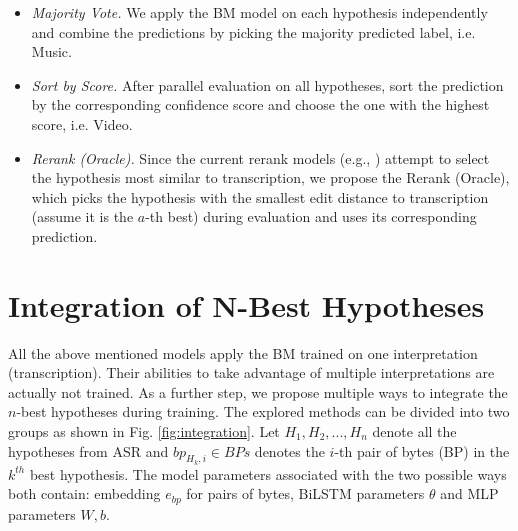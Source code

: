 \begin{itemize}
	\item \textit{Majority Vote.} We apply the BM model on each hypothesis independently and combine the predictions by picking the majority predicted label, i.e. Music.
	\vspace{-1ex}
	\item \textit{Sort by Score.} After parallel evaluation on all hypotheses, sort the prediction by the corresponding confidence score and choose the one with the highest score, i.e. Video.
	\vspace{-1ex}
	\item \textit{Rerank (Oracle).} 
	Since the current rerank models (e.g., \citep{peng2013search, charniak2005coarse, morbini2012reranking}) attempt to select the hypothesis most similar to transcription, we propose the Rerank (Oracle), which picks the hypothesis with the smallest edit distance to transcription (assume it is the $a$-th best) during evaluation and uses its corresponding prediction. 
	
\end{itemize}


\section{Integration of N-Best Hypotheses}
\label{speech:models}
All the above mentioned models apply the BM trained on one interpretation (transcription). Their abilities to take advantage of multiple interpretations are actually not trained. As a further step, we propose multiple ways to integrate the $n$-best hypotheses during training. The explored methods can be divided into two groups as shown in Fig. \ref{fig:integration}. Let $H_1, H_2,..., H_n $ denote all the hypotheses from ASR and $bp_{H_k, i} \in BPs$ denotes the $i$-th pair of bytes (BP) in the $k^{th}$ best hypothesis. The model parameters associated with the two possible ways both contain: embedding $e_{bp}$ for pairs of bytes, BiLSTM parameters $\theta$ and MLP parameters $W, b$.

